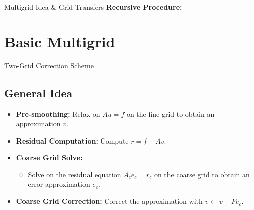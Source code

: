 \documentclass{beamer}
\begin{document}
\begin{frame}{Multigrid Idea \& Grid Transfers}
\textbf{Recursive Procedure:}
\begin{enumerate}
\end{enumerate}

\end{frame}
    
\section{Basic Multigrid}

\begin{frame}{Two-Grid Correction Scheme}
\subsection*{General Idea}

\begin{itemize}
    \item \textbf{Pre-smoothing:} Relax on $Au = f$ on the fine grid to obtain an approximation $v$.
    \item \textbf{Residual Computation:} Compute $r = f - Av$.
    \item \textbf{Coarse Grid Solve:}
    \begin{itemize}
        \item Solve on the residual equation $A_{c}e_{c} = r_{c}$ on the coarse grid to obtain an error approximation $e_{c}$.
    \end{itemize}
    \item \textbf{Coarse Grid Correction:} Correct the approximation with $v \leftarrow v + Pe_{c}$.
\end{itemize}
\end{frame}
\end{document}
